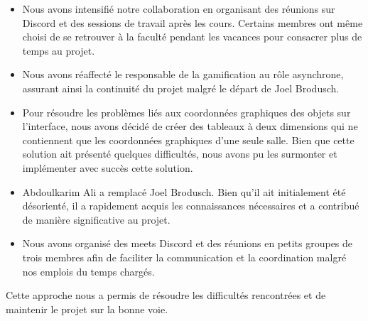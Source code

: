 \documentclass{article}
\begin{document}
\begin{itemize}
\item Nous avons intensifié notre collaboration en organisant des réunions sur Discord et des sessions de travail après les cours. Certains membres ont même choisi de se retrouver à la faculté pendant les vacances pour consacrer plus de temps au projet.
\item Nous avons réaffecté le responsable de la gamification au rôle asynchrone, assurant ainsi la continuité du projet malgré le départ de Joel Brodusch.
\item Pour résoudre les problèmes liés aux coordonnées graphiques des objets sur l'interface, nous avons décidé de créer des tableaux à deux dimensions qui ne contiennent que les coordonnées graphiques d'une seule salle. Bien que cette solution ait présenté quelques difficultés, nous avons pu les surmonter et implémenter avec succès cette solution.
\item Abdoulkarim Ali a remplacé Joel Brodusch. Bien qu'il ait initialement été désorienté, il a rapidement acquis les connaissances nécessaires et a contribué de manière significative au projet.
\item Nous avons organisé des meets Discord et des réunions en petits groupes de trois membres afin de faciliter la communication et la coordination malgré nos emplois du temps chargés.
\end{itemize}

Cette approche nous a permis de résoudre les difficultés rencontrées et de maintenir le projet sur la bonne voie.
\end{document}

